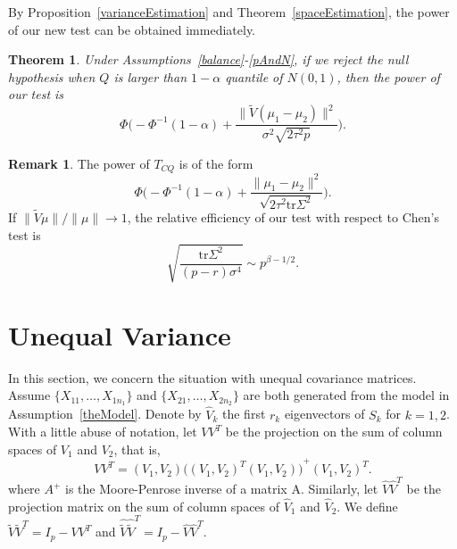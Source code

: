 \documentclass[review]{elsarticle}
\theoremstyle{plain}
\newtheorem{theorem}{\quad\quad Theorem}
\theoremstyle{definition}
\newtheorem{remark}{\quad\quad Remark}
\theoremstyle{remark}
\begin{document}
By Proposition~\ref{varianceEstimation}  and Theorem~\ref{spaceEstimation}, the power of our new test can be obtained immediately.


\begin{theorem}\label{testPowerh}
    Under Assumptions~\ref{balance}-\ref{pAndN},
    if we reject the null hypothesis when $Q$ is larger than $1-\alpha$ quantile of $N(0,1)$, then the power of our test is
    \begin{equation*}
        \Phi\Big(-\Phi^{-1}(1-\alpha)+\frac{\|\tilde{V}(\mu_1-\mu_2)\|^2}{\sigma^2\sqrt{2\tau^2p}}\Big).
    \end{equation*}
\end{theorem}


\begin{remark} The power of $T_{CQ}$ is of the form
\begin{equation*}
    \Phi\Big(-\Phi^{-1}(1-\alpha)+\frac{\|\mu_1-\mu_2\|^2}{\sqrt{2\tau^2\mathrm{tr}\Sigma^2}}\Big).
\end{equation*}
If $\|\tilde{V}\mu\|/\|\mu\|\to 1$, the relative efficiency of our test with respect to Chen's test is
\begin{equation*}
    \sqrt{\frac{\mathrm{tr}\Sigma^2}{(p-r)\sigma^4}}\sim p^{\beta-1/2}.
\end{equation*}
\end{remark}

\section{Unequal Variance}

In this section, we concern the situation with unequal covariance matrices.
Assume $\{X_{11},\ldots, X_{1n_1}\}$ and $\{X_{21},\ldots, X_{2n_2}\}$ are both generated from the model in Assumption~\ref{theModel}.
Denote by $\hat{V}_k$ the first $r_k$ eigenvectors of $S_k$ for $k=1,2$.
With a little abuse of notation, let $VV^T$ be the projection on the sum of column spaces of $V_1$ and $V_2$, that is,
\begin{equation*}
    VV^T =(V_1,V_2){\big({(V_1,V_2)}^T (V_1,V_2)\big)}^{+}{(V_1,V_2)}^T.
\end{equation*}
where $A^{+}$ is the Moore-Penrose inverse of a matrix A. Similarly, let $\hat{V}\hat{V}^T$ be the projection matrix on the sum of column spaces of $\hat{V}_1$ and $\hat{V}_2$.
 We define $\tilde{V}\tilde{V}^T=I_{p}-VV^T$ and $\hat{\tilde{V}}\hat{\tilde{V}}^T=I_{p}-\hat{V}\hat{V}^T$. 
\end{document}
